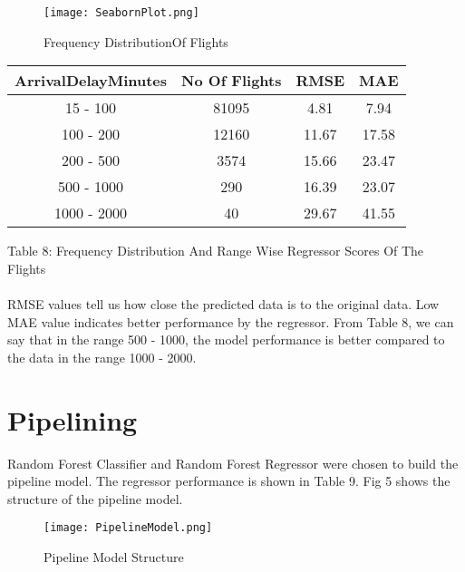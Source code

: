 \documentclass[12pt,letterpaper]{article}
\begin{document}
    
    
    \begin{figure}[H]
        \begin{center}
            \texttt{[image: SeabornPlot.png]}
            \caption{Frequency DistributionOf Flights}
        \end{center}
    \end{figure}
    
    
    \begin{table}[H]
        \begin{center}
            \begin{tabular}{ |c|c|c|c| } 
                \hline
                ArrivalDelayMinutes & No Of Flights & RMSE & MAE\\ 
                \hline
                15 - 100 & 81095 & 4.81 & 7.94\\ 
                \hline
                100 - 200 & 12160 & 11.67 & 17.58\\ 
                \hline
                200 - 500 & 3574 & 15.66 & 23.47\\ 
                \hline
                500 - 1000 & 290 & 16.39 & 23.07\\ 
                \hline
                1000 - 2000 & 40 & 29.67 & 41.55\\ 
                \hline
        \end{tabular}
        \end{center}
        \begin{center}
            Table 8: Frequency Distribution And Range Wise Regressor Scores Of The Flights
    \end{center}
    \end{table}

    \paragraph{}
    
        RMSE values tell us how close the predicted data is to the original data. Low MAE value indicates better performance by the regressor. From Table 8, we can say that in the range 500 - 1000, the model performance is better compared to the data in the range 1000 - 2000.
    
\section{Pipelining}
    
    Random Forest Classifier and Random Forest Regressor were chosen to build the pipeline model. The regressor performance is shown in Table 9. Fig 5 shows the structure of the pipeline model. 
    \begin{figure}[H]%
            \texttt{[image: PipelineModel.png]}%
            \caption{Pipeline Model Structure}
    \end{figure}
    
\end{document}
